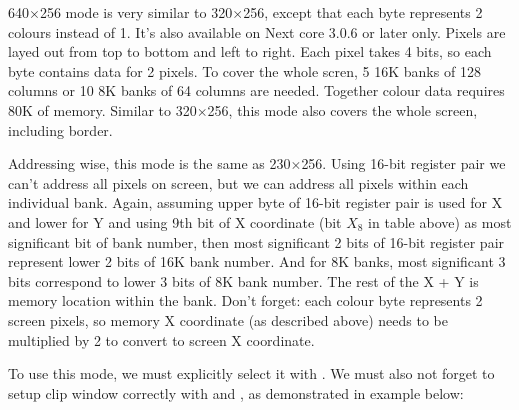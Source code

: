 640$\times$256 mode is very similar to 320$\times$256, except that each byte represents 2 colours instead of 1. It's also available on Next core 3.0.6 or later only. Pixels are layed out from top to bottom and left to right. Each pixel takes 4 bits, so each byte contains data for 2 pixels. To cover the whole scren, 5 16K banks of 128 columns or 10 8K banks of 64 columns are needed. Together colour data requires 80K of memory. Similar to 320$\times$256, this mode also covers the whole screen, including border.

Addressing wise, this mode is the same as 230$\times$256. Using 16-bit register pair we can't address all pixels on screen, but we can address all pixels within each individual bank. Again, assuming upper byte of 16-bit register pair is used for X and lower for Y and using 9th bit of X coordinate (bit $X_8$ in table above) as most significant bit of bank number, then most significant 2 bits of 16-bit register pair represent lower 2 bits of 16K bank number. And for 8K banks, most significant 3 bits correspond to lower 3 bits of 8K bank number. The rest of the X + Y is memory location within the bank. Don't forget: each colour byte represents 2 screen pixels, so memory X coordinate (as described above) needs to be multiplied by 2 to convert to screen X coordinate.

To use this mode, we must explicitly select it with . We must also not forget to setup clip window correctly with  and , as demonstrated in example below:

